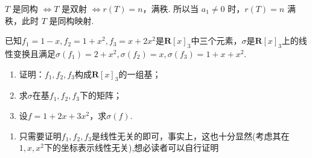 \begin{exercise}
\begin{exgroup}
\begin{answer}
            $ T $ 是同构 $ \iff T $ 是双射 $ \iff r(T) = n $，满秩. 所以当 $ a_1 \neq 0 $ 时，$ r(T) = n $ 满秩，此时 $ T $ 是同构映射.
        \end{answer}

        \item 已知$f_1=1-x,f_2=1+x^2,f_3=x+2x^2$是$\mathbf{R}[x]_3$中三个元素，$\sigma$是$\mathbf{R}[x]_3$上的线性变换且满足$\sigma(f_1)=2+x^2,\sigma(f_2)=x,\sigma(f_3)=1+x+x^2$.
        \begin{enumerate}
            \item 证明：$f_1,f_2,f_3$构成$\mathbf{R}[x]_3$的一组基；

            \item 求$\sigma$在基$f_1,f_2,f_3$下的矩阵；

            \item 设$f=1+2x+3x^2$，求$\sigma(f)$.
        \end{enumerate}

        \begin{answer}
            \begin{enumerate}
                \item 只需要证明$f_1,f_2,f_3$是线性无关的即可，事实上，这也十分显然(考虑其在$1,x,x^2$下的坐标表示线性无关),想必读者可以自行证明


\end{enumerate}
\end{answer}
\end{exgroup}
\end{exercise}
